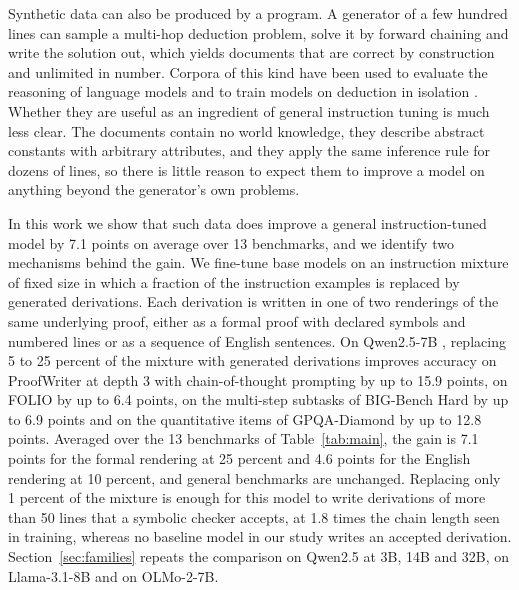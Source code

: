 \documentclass{article}
\begin{document}
Synthetic data can also be produced by a program. A generator of a few
hundred lines can sample a multi-hop deduction problem, solve it by forward
chaining and write the solution out, which yields documents that are correct
by construction and unlimited in number. Corpora of this kind have been used
to evaluate the reasoning of language models \citep{clark2020transformers,
tafjord2021proofwriter, saparov2023language} and to train models on deduction
in isolation \citep{morishita2023fld, morishita2024alt}. Whether they are
useful as an ingredient of general instruction tuning is much less clear. The
documents contain no world knowledge, they describe abstract constants with
arbitrary attributes, and they apply the same inference rule for dozens of
lines, so there is little reason to expect them to improve a model on
anything beyond the generator's own problems.

In this work we show that such data does improve a general instruction-tuned
model by 7.1 points on average over 13 benchmarks, and we identify two
mechanisms behind the gain. We fine-tune base
models on an instruction mixture of fixed size in which a
fraction of the instruction examples is replaced by generated derivations.
Each derivation is written in one of two renderings of the same underlying
proof, either as a formal proof with declared symbols and numbered lines or
as a sequence of English sentences. On Qwen2.5-7B \citep{qwen2025qwen25},
replacing 5 to 25 percent of the mixture with generated derivations
improves accuracy on ProofWriter \citep{tafjord2021proofwriter} at depth 3
with chain-of-thought prompting by up to 15.9 points, on FOLIO
\citep{han2024folio} by up to 6.4 points, on the multi-step subtasks of
BIG-Bench Hard by up to 6.9 points and on the quantitative items of
GPQA-Diamond by up to 12.8 points. Averaged over
the 13 benchmarks of Table~\ref{tab:main}, the gain is 7.1 points for the
formal rendering at 25 percent and 4.6 points for the English rendering at
10 percent, and general benchmarks are unchanged. Replacing only 1
percent of the mixture is enough for this model to write derivations of
more than 50 lines that a symbolic checker accepts, at 1.8 times the chain
length seen in training, whereas no baseline model in our study writes an
accepted derivation. Section~\ref{sec:families} repeats the comparison on
Qwen2.5 at 3B, 14B and 32B, on Llama-3.1-8B and on OLMo-2-7B.
\end{document}
